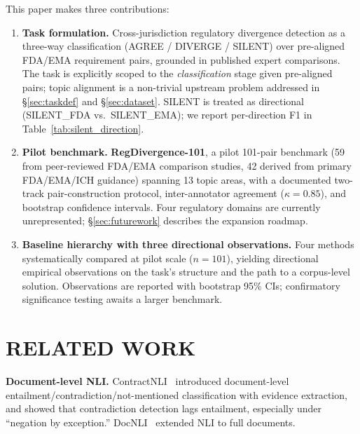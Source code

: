 \documentclass[manuscript]{acmart}
\makeatletter
\let\@acmt@@section\section
\renewcommand{\section}[1]{%
  \@acmt@@section{\texorpdfstring{\MakeUppercase{#1}}{#1}}}
\makeatother
\begin{document}
This paper makes three contributions:
\begin{enumerate}
\item \textbf{Task formulation.} Cross-jurisdiction regulatory divergence
  detection as a three-way classification (AGREE / DIVERGE / SILENT) over
  pre-aligned FDA/EMA requirement pairs, grounded in published expert
  comparisons. The task is explicitly scoped to the \textit{classification}
  stage given pre-aligned pairs; topic alignment is a non-trivial upstream
  problem addressed in \S\ref{sec:taskdef} and \S\ref{sec:dataset}. SILENT
  is treated as directional (SILENT\_FDA vs.\ SILENT\_EMA); we report
  per-direction F1 in Table~\ref{tab:silent_direction}.
\item \textbf{Pilot benchmark.} \textbf{RegDivergence-101}, a pilot 101-pair
  benchmark (59 from peer-reviewed FDA/EMA comparison studies, 42 derived from
  primary FDA/EMA/ICH guidance) spanning 13 topic areas, with a documented
  two-track pair-construction protocol, inter-annotator agreement
  ($\kappa = 0.85$), and bootstrap confidence intervals. Four regulatory
  domains are currently unrepresented; \S\ref{sec:futurework} describes the
  expansion roadmap.
\item \textbf{Baseline hierarchy with three directional observations.} Four
  methods systematically compared at pilot scale ($n = 101$), yielding
  directional empirical observations on the task's structure and the path to a
  corpus-level solution. Observations are reported with bootstrap 95\% CIs;
  confirmatory significance testing awaits a larger benchmark.
\end{enumerate}

\section{Related Work}

\textbf{Document-level NLI.} ContractNLI~\cite{koreeda2021contractnli} introduced
document-level entailment/contradiction/not-mentioned classification with
evidence extraction, and showed that contradiction detection lags entailment,
especially under ``negation by exception.'' DocNLI~\cite{yin2021docnli} extended
NLI to full documents.
\end{document}
